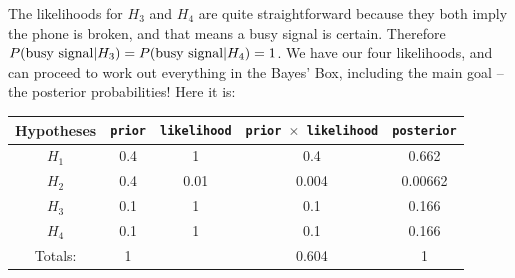 The likelihoods for $H_3$ and $H_4$ are quite straightforward
because they both imply the phone is broken, and that means a busy signal is certain.
Therefore $P(\textnormal{busy signal} | H_3) = P(\textnormal{busy signal} | H_4) = 1$.
We have our four likelihoods, and can proceed to work out everything in the
Bayes' Box, including the main goal -- the posterior probabilities! Here it is:
\begin{table}[ht!]
\begin{center}
\begin{tabular}{|c|c|c|c|c|}
\hline
{\bf Hypotheses} & {\tt prior} & {\tt likelihood} &
{\tt prior $\times$ likelihood} & {\tt posterior}\\
\hline
$H_1$ & 0.4 & 1 &  0.4 & 0.662\\
$H_2$ & 0.4 & 0.01 & 0.004 & 0.00662\\
$H_3$ & 0.1 & 1 & 0.1 & 0.166\\
$H_4$ & 0.1 & 1 & 0.1 & 0.166\\
\hline
Totals: & 1 & & 0.604 & 1\\
\hline
\end{tabular}
\end{center}
\end{table}


